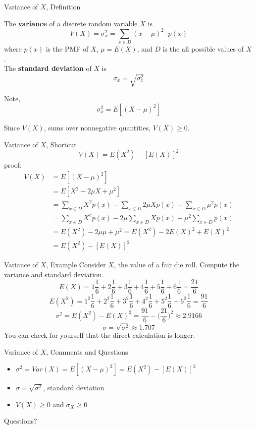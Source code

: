 \documentclass[handout]{beamer}
\newcommand{\qtns}[0]{\begin{center} Questions? \end{center}}
\newcommand{\nl}[1]{\vspace{#1 em}}
\begin{document}
\begin{frame}{Variance of $X$, Definition}
    \begin{block}{}
        The \textbf{variance} of a discrete random variable $X$ is 
        $$V(X) = \sigma^2_x = \sum_{x \in D} (x-\mu)^2 \cdot p(x) $$
        where $p(x)$ is the PMF of $X$, $\mu = E(X)$, and $D$ is the all possible values of $X$.\\ \nl{0.5}
        The \textbf{standard deviation} of $X$ is
        $$ \sigma_x = \sqrt{\sigma_x^2} $$
    \end{block}
    Note,
    $$\sigma_x^2 = E[(X-\mu)^2]$$
    \begin{block}{}
    Since $V(X)$, sums over nonnegative quantities, $V(X) \geq 0$.
    \end{block}
\end{frame}

\begin{frame}{Variance of $X$, Shortcut}
    $$V(X) = E(X^2) - [E(X)]^2$$
    proof:
    \begin{align*}
        V(X) & = E[(X-\mu)^2] \\
        & = E[X^2 -2\mu X + \mu^2] \\
        & = \sum_{x \in D} X^2 p(x) - \sum_{x \in D} 2\mu X p(x) + \sum_{x \in D} \mu^2 p(x) \\
        & = \sum_{x \in D} X^2 p(x) - 2 \mu \sum_{x \in D} X p(x) + \mu^2 \sum_{x \in D} p(x) \\
        & = E(X^2) - 2 \mu \mu + \mu^2 = E(X^2) - 2 E(X)^2 + E(X)^2\\
        & = E(X^2) - [E(X)]^2
    \end{align*}
\end{frame}

\begin{frame}{Variance of $X$, Example}
    Consider $X$, the value of a fair die roll. Compute the variance and standard deviation.
    \pause
    $$ E(X) = 1 \frac{1}{6} + 2\frac{1}{6} + 3 \frac{1}{6} + 4 \frac{1}{6} + 5 \frac{1}{6} + 6\frac{1}{6} = \frac{21}{6}$$
    \pause
    $$ E(X^2) = 1^2 \frac{1}{6} + 2^2 \frac{1}{6} + 3^2 \frac{1}{6} + 4^2 \frac{1}{6} + 5^2 \frac{1}{6} + 6^2 \frac{1}{6} = \frac{91}{6}$$
    \pause
    $$ \sigma^2 = E(X^2) - E(X)^2 = \frac{91}{6} - \Big(\frac{21}{6}\Big)^2 \approx 2.9166$$
    $$ \sigma = \sqrt{\sigma^2} \approx 1.707$$
    You can check for yourself that the direct calculation is longer.
\end{frame}

\begin{frame}{Variance of $X$, Comments and Questions}
    \begin{itemize}
        \item $\sigma^2 = Var(X) = E[(X-\mu)^2] = E(X^2) - [E(X)]^2$
        \item $\sigma = \sqrt{\sigma^2}$, standard deviation
        \item $V(X) \geq 0$ and $\sigma_X \geq 0$
    \end{itemize}
    \qtns
\end{frame}
\end{document}
